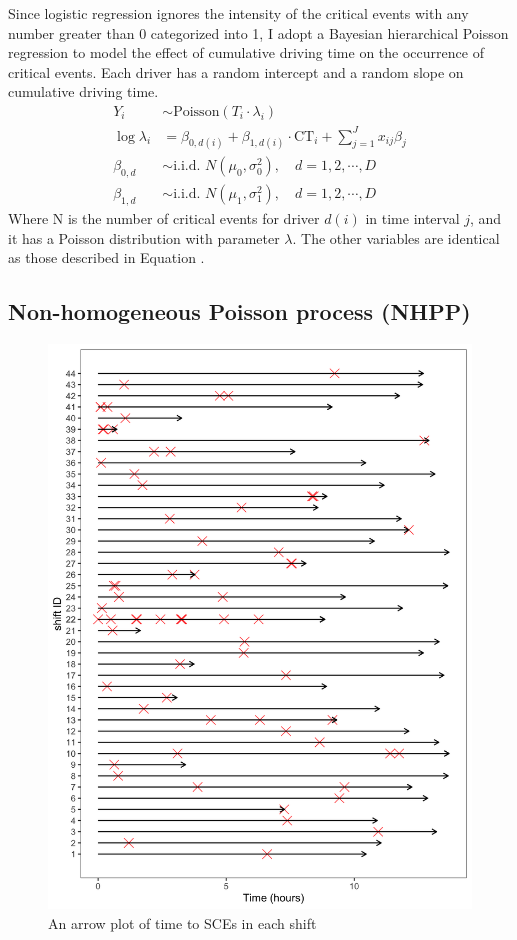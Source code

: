 \documentclass[12pt]{book}
\numberwithin{equation}{chapter}
\begin{document}
Since logistic regression ignores the intensity of the critical events with any number greater than 0 categorized into 1, I adopt a Bayesian hierarchical Poisson regression to model the effect of cumulative driving time on the occurrence of critical events. Each driver has a random intercept and a random slope on cumulative driving time.
\[
\begin{split}
Y_{i}  & \sim \text{Poisson}(T_i\cdot\lambda_i)\\
\log\lambda_{i} & =\beta_{0, d(i)} + \beta_{1, d(i)} \cdot \text{CT}_i + \sum_{j=1}^{J} x_{ij}\beta_j\\
\beta_{0, d} &\sim \text{i.i.d. } N(\mu_0, \sigma_0^2), \quad d = 1, 2, \cdots, D\\
\beta_{1, d} &\sim \text{i.i.d. } N(\mu_1, \sigma_1^2), \quad d = 1, 2, \cdots, D
\label{eq:hierarchicalpoisson}
\end{split}
\]
Where N is the number of critical events for driver \(d(i)\) in time interval \(j\), and it has a Poisson distribution with parameter \(\lambda\). The other variables are identical as those described in Equation .

\hypertarget{non-homogeneous-poisson-process-nhpp}{%
\subsection{Non-homogeneous Poisson process (NHPP)}\label{non-homogeneous-poisson-process-nhpp}}

\begin{figure}[!ht]

{\centering \includegraphics[width=0.5\linewidth]{figs/NHPP_arrow_plot} 

}

\caption{An arrow plot of time to SCEs in each shift}\label{fig:arrowplot}
\end{figure}
\end{document}
